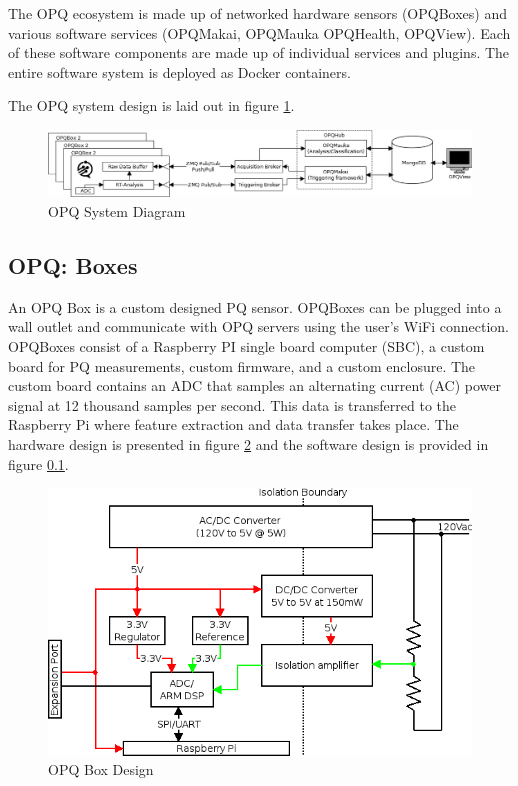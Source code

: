 The OPQ ecosystem is made up of networked hardware sensors (OPQBoxes) and various software services (OPQMakai, OPQMauka OPQHealth, OPQView). Each of these software components are made up of individual services and plugins. The entire software system is deployed as Docker containers.

The OPQ system design is laid out in figure \ref{fig:opq-system}.

\begin{figure}
	\centering
	\includegraphics[width=\linewidth]{figures/system-diagram.png}
	\caption{OPQ System Diagram}\label{fig:opq-system}
\end{figure}


\subsection{OPQ: Boxes}
An OPQ Box is a custom designed PQ sensor. OPQBoxes can be plugged into a wall outlet and communicate with OPQ servers using the user's WiFi connection. OPQBoxes consist of a Raspberry PI single board computer (SBC), a custom board for PQ measurements, custom firmware, and a custom enclosure. The custom board contains an ADC that samples an alternating current (AC) power signal at 12 thousand samples per second. This data is transferred to the Raspberry Pi where feature extraction and data transfer takes place. The hardware design is presented in figure \ref{fig:opq-box-design} and the software design is provided in figure \ref{}.

\begin{figure}
	\centering
	\includegraphics[width=.75\linewidth]{figures/opqbox_diagram.png}
	\caption{OPQ Box Design}\label{fig:opq-box-design}
\end{figure}

